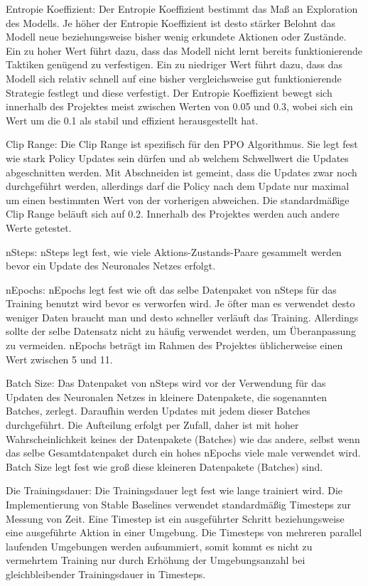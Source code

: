 Entropie Koeffizient: Der Entropie Koeffizient bestimmt das Maß an Exploration des Modells. Je höher der Entropie Koeffizient ist desto stärker Belohnt das Modell neue beziehungsweise bisher wenig erkundete Aktionen oder Zustände. Ein zu hoher Wert führt dazu, dass das Modell nicht lernt bereits funktionierende Taktiken genügend zu verfestigen. Ein zu niedriger Wert führt dazu, dass das Modell sich relativ schnell auf eine bisher vergleichsweise gut funktionierende Strategie festlegt und diese verfestigt. Der Entropie Koeffizient bewegt sich innerhalb des Projektes meist zwischen Werten von 0.05 und 0.3, wobei sich ein Wert um die 0.1 als stabil und effizient herausgestellt hat.

Clip Range: Die Clip Range ist spezifisch für den PPO Algorithmus. Sie legt fest wie stark Policy Updates sein dürfen und ab welchem Schwellwert die Updates abgeschnitten werden. Mit Abschneiden ist gemeint, dass die Updates zwar noch durchgeführt werden, allerdings darf die Policy nach dem Update nur maximal um einen bestimmten Wert von der vorherigen abweichen. Die standardmäßige Clip Range beläuft sich auf 0.2. Innerhalb des Projektes werden auch andere Werte getestet.

nSteps: nSteps legt fest, wie viele Aktions-Zustands-Paare gesammelt werden bevor ein Update des Neuronales Netzes erfolgt.

nEpochs: nEpochs legt fest wie oft das selbe Datenpaket von nSteps für das Training benutzt wird bevor es verworfen wird. Je öfter man es verwendet desto weniger Daten braucht man und desto schneller verläuft das Training. Allerdings sollte der selbe Datensatz nicht zu häufig verwendet werden, um Überanpassung zu vermeiden. nEpochs beträgt im Rahmen des Projektes üblicherweise einen Wert zwischen 5 und 11.

Batch Size: Das Datenpaket von nSteps wird vor der Verwendung für das Updaten des Neuronalen Netzes in kleinere Datenpakete, die sogenannten Batches, zerlegt. Daraufhin werden Updates mit jedem dieser Batches durchgeführt. Die Aufteilung erfolgt per Zufall, daher ist mit hoher Wahrscheinlichkeit keines der Datenpakete (Batches) wie das andere, selbst wenn das selbe Gesamtdatenpaket durch ein hohes nEpochs viele male verwendet wird. Batch Size legt fest wie groß diese kleineren Datenpakete (Batches) sind.

Die Trainingsdauer: Die Trainingsdauer legt fest wie lange trainiert wird. Die Implementierung von Stable Baselines verwendet standardmäßig Timesteps zur Messung von Zeit. Eine Timestep ist ein ausgeführter Schritt beziehungsweise eine ausgeführte Aktion in einer Umgebung. Die Timesteps von mehreren parallel laufenden Umgebungen werden aufsummiert, somit kommt es nicht zu vermehrtem Training nur durch Erhöhung der Umgebungsanzahl bei gleichbleibender Trainingsdauer in Timesteps.
